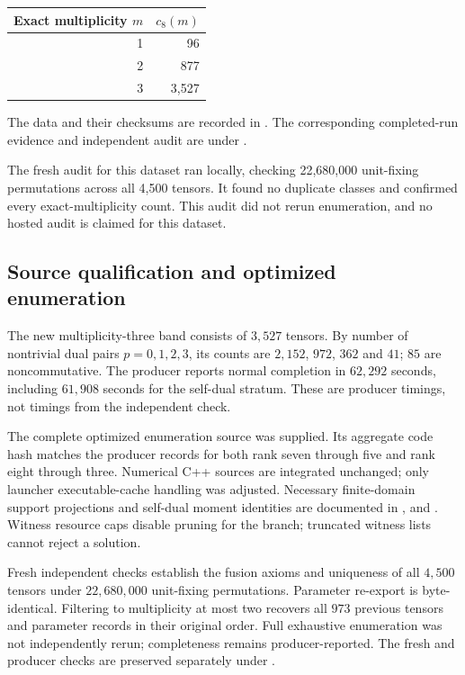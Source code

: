 \documentclass[11pt,a4paper]{article}
\theoremstyle{definition}\newtheorem{definition}[theorem]{Definition}\newtheorem{remark}[theorem]{Remark}
\newcommand{\Rank}{8}
\begin{document}
\begin{center}\begin{tabular}{rr}\toprule Exact multiplicity $m$ & $c_{\Rank}(m)$\\\midrule
1 & 96\\
2 & 877\\
3 & 3,527\\
\bottomrule\end{tabular}\end{center}

The data and their checksums are recorded in . The corresponding completed-run evidence and independent audit are under .

The fresh audit for this dataset ran locally, checking 22,680,000 unit-fixing permutations across all 4,500 tensors. It found no duplicate classes and confirmed every exact-multiplicity count. This audit did not rerun enumeration, and no hosted audit is claimed for this dataset.

\subsection{Source qualification and optimized enumeration}
The new multiplicity-three band consists of $3,527$ tensors. By number of
nontrivial dual pairs $p=0,1,2,3$, its counts are $2,152$, $972$, $362$ and
$41$; $85$ are noncommutative. The producer reports normal completion in
$62,292$ seconds, including $61,908$ seconds for the self-dual stratum.
These are producer timings, not timings from the independent check.

The complete optimized enumeration source was supplied. Its aggregate code
hash matches the producer records for both rank seven through five and rank
eight through three. Numerical C++ sources are integrated unchanged; only
launcher executable-cache handling was adjusted. Necessary finite-domain
support projections and self-dual moment identities are documented in
,  and
. Witness resource caps disable pruning
for the branch; truncated witness lists cannot reject a solution.

Fresh independent checks establish the fusion axioms and uniqueness of all
$4,500$ tensors under $22,680,000$ unit-fixing permutations. Parameter re-export
is byte-identical. Filtering to multiplicity at most two recovers all $973$
previous tensors and parameter records in their original order. Full exhaustive
enumeration was not independently rerun; completeness remains producer-reported.
The fresh and producer checks are preserved separately under
.
\end{document}
